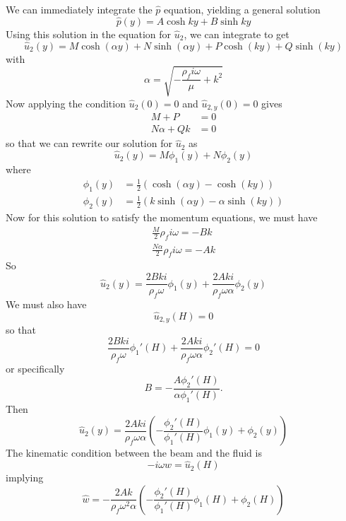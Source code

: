 \documentclass{article}
\begin{document}
We can immediately integrate the $\hat{p}$ equation, yielding a general solution
\begin{equation} \hat{p}(y) = A\cosh{ky}+B\sinh{ky}  \label{eq:eq550} \end{equation}
Using this solution in the equation for $\hat{u}_2$, we can integrate to get
\begin{equation} \hat{u}_2(y) = M\cosh(\alpha y)+N\sinh(\alpha y)+P\cosh(k y)+Q\sinh(k y) \label{eq:eq600} \end{equation}
with 
\begin{equation} \alpha = \sqrt{-\frac{\rho_f i \omega}{\mu}+k^2}\label{eq:eq700} \end{equation}
Now applying the condition $\hat{u}_2(0)=0$ and $\hat{u}_{2,y}(0) = 0$ gives
\begin{align*}
M+P&=0\\
N\alpha+Qk&=0
\end{align*}
so that we can rewrite our solution for $\hat{u}_2$ as 
\[\hat{u}_2(y) = M\phi_1(y)+N\phi_2(y) \]
where 
\begin{equation}
\begin{aligned}
\phi_1(y) &= \frac{1}{2}\left(\cosh(\alpha y)-\cosh(k y)\right) \\
\phi_2(y) &= \frac{1}{2}\left(k\sinh(\alpha y)-\alpha\sinh(k y)\right)
\end{aligned} \label{eq:eq800}
\end{equation}
Now for this solution to satisfy the momentum equations, we must have
\begin{align*}
\frac{M}{2}\rho_f i \omega = -Bk \\
\frac{N\alpha}{2}\rho _fi \omega = -Ak
\end{align*}
So 
\begin{equation} \hat{u}_2(y) = \frac{2Bki}{\rho_f \omega}\phi_1(y)+\frac{2Aki}{\rho_f \omega \alpha}\phi_2(y)  \label{eq:eq900} \end{equation}
We must also have
\[\hat{u}_{2,y}(H) = 0 \]
so that
\[ \frac{2Bki}{\rho _f\omega}\phi_1'(H)+\frac{2Aki}{\rho_f \omega \alpha}\phi_2'(H) = 0 \]
or specifically
\[ B = -\frac{A\phi_2'(H)}{\alpha \phi_1'(H)}. \]
Then
\begin{equation} \hat{u}_2(y) = \frac{2Aki}{\rho_f \omega \alpha}\left(-\frac{\phi_2'(H)}{\phi_1'(H)}\phi_1(y)+\phi_2(y)\right)   \label{eq:eq1000} \end{equation}
The kinematic condition between the beam and the fluid is
\[ -i\omega \hat{w} = \hat{u}_2(H) \]
implying
\begin{equation} \hat{w} = -\frac{2Ak}{\rho_f \omega^2 \alpha}\left(-\frac{\phi_2'(H)}{\phi_1'(H)}\phi_1(H)+\phi_2(H)\right)   \label{eq:eq1100} \end{equation}
\end{document}
